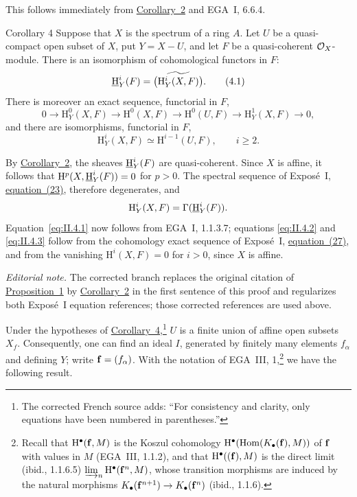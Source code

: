 This follows immediately from \hyperref[II.2]{Corollary~2} and EGA~I, 6.6.4.

\begin{sgastatement}{Corollary 4}
Suppose that $X$ is the spectrum of a ring $A$. Let $U$ be a
quasi-compact open subset of $X$, put $Y=X-U$, and let $F$ be a
quasi-coherent $\mathcal O_X$-module. There is an isomorphism of cohomological
functors in $F$:
\begin{equation}
  \mathop{\underline{\mathrm H}}\nolimits_Y^i(F)=\widetilde{\bigl(\mathrm H_Y^i(X,F)\bigr)}.
  \tag{4.1}\label{eq:II.4.1}
\end{equation}
There is moreover an exact sequence, functorial in $F$,
\begin{equation}
  0\longrightarrow \mathrm H_Y^0(X,F)
  \longrightarrow \mathrm H^0(X,F)
  \longrightarrow \mathrm H^0(U,F)
  \longrightarrow \mathrm H_Y^1(X,F)
  \longrightarrow 0,
  \tag{4.2}\label{eq:II.4.2}
\end{equation}
and there are isomorphisms, functorial in $F$,
\begin{equation}
  \mathrm H_Y^i(X,F)\simeq \mathrm H^{i-1}(U,F),
  \qquad i\geq 2.
  \tag{4.3}\label{eq:II.4.3}
\end{equation}
\end{sgastatement}

By \hyperref[II.2]{Corollary~2}, the sheaves $\mathop{\underline{\mathrm H}}\nolimits_Y^i(F)$ are quasi-coherent. Since $X$ is
affine, it follows that
$\mathrm H^p(X,\mathop{\underline{\mathrm H}}\nolimits_Y^i(F))=0$ for $p>0$. The spectral sequence of
Expos\'e~I, \hyperref[eq:I.23]{equation~(23)}, therefore degenerates, and
\[
  \mathrm H_Y^i(X,F)=\Gamma(\mathop{\underline{\mathrm H}}\nolimits_Y^i(F)).
\]
Equation~\eqref{eq:II.4.1} now follows from EGA~I, 1.1.3.7; equations
\eqref{eq:II.4.2} and \eqref{eq:II.4.3} follow from the cohomology exact
sequence of Expos\'e~I, \hyperref[eq:I.27]{equation~(27)}, and from the vanishing
$\mathrm H^i(X,F)=0$ for $i>0$, since $X$ is affine.

\noindent\textit{Editorial note.} The corrected branch replaces the
original citation of \hyperref[II.1]{Proposition~1} by \hyperref[II.2]{Corollary~2} in the first sentence of
this proof and regularizes both Expos\'e~I equation references; those
corrected references are used above.

Under the hypotheses of \hyperref[II.4]{Corollary~4},\footnote{The corrected French source
adds: ``For consistency and clarity, only equations have been numbered in
parentheses.''} $U$ is a finite union of affine open subsets $X_f$.
Consequently, one can find an ideal $I$, generated by finitely many elements
$f_\alpha$ and defining $Y$; write $\mathbf f=(f_\alpha)$. With the notation of
EGA~III, 1,\footnote{Recall that $\mathrm H^\bullet(\mathbf f,M)$ is the Koszul
cohomology $\mathrm H^\bullet(\operatorname{Hom}(K_\bullet(\mathbf f),M))$ of
$\mathbf f$ with values in $M$ (EGA~III, 1.1.2), and that
$\mathrm H^\bullet((\mathbf f),M)$ is the direct limit (ibid., 1.1.6.5)
$\varinjlim_n\mathrm H^\bullet(\mathbf f^n,M)$, whose transition morphisms are
induced by the natural morphisms
$K_\bullet(\mathbf f^{n+1})\to K_\bullet(\mathbf f^n)$ (ibid., 1.1.6).} we have the
following result.

